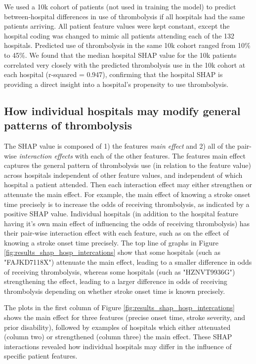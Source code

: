 \begin{itemize}
We used a 10k cohort of patients (not used in training the model) to predict between-hospital differences in use of thrombolysis if all hospitals had the same patients arriving. All patient feature values were kept constant, except the hospital coding was changed to mimic all patients attending each of the 132 hospitals. Predicted use of thrombolysis in the same 10k cohort ranged from 10\% to 45\%. We found that the median hospital SHAP value for the 10k patients correlated very closely with the predicted thrombolysis use in the 10k cohort at each hospital (r-squared = 0.947), confirming that the hospital SHAP is providing a direct insight into a hospital's propensity to use thrombolysis.



\subsection{How individual hospitals may modify general patterns of thrombolysis}

The SHAP value  is composed of 1) the features \emph{main effect} and 2) all of the pair-wise \emph{interaction effects} with each of the other features. The features main effect captures the general pattern of thrombolysis use (in relation to the feature value) across hospitals independent of other feature values, and independent of which hospital a patient attended. Then each interaction effect may either strengthen or attenuate the main effect. For example, the main effect of knowing a stroke onset time precisely is to increase the odds of receiving thrombolysis, as indicated by a positive SHAP value. Individual hospitals (in addition to the hospital feature having it's own main effect of influencing the odds of receiving thrombolysis) has their pair-wise interaction effect with each feature, such as on the effect of knowing a stroke onset time precisely. The top line of graphs in Figure \ref{fig:results_shap_hosp_intercations} show that some hospitals (such as "FAJKD7118X") attenuate the main effect, leading to a smaller difference in odds of receiving thrombolysis, whereas some hospitals (such as "HZNVT9936G") strengthening the effect, leading to a larger difference in odds of receiving thrombolysis depending on whether stroke onset time is known precisely.

The plots in the first column of Figure \ref{fig:results_shap_hosp_intercations} shows the main effect for three features (precise onset time, stroke severity, and prior disability), followed by examples of hospitals which either attenuated (column two) or strengthened (column three) the main effect. These SHAP interactions revealed how individual hospitals may differ in the influence of specific patient features.


\end{itemize}
